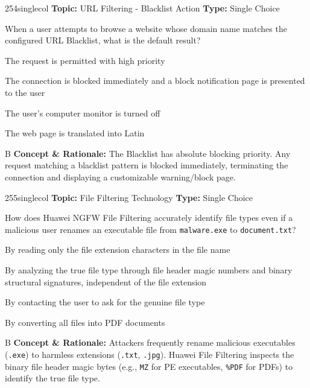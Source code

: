 \begin{qcard}{254}{singlecol}
\textcolor{darkslate!75}{\small\textbf{Topic:} URL Filtering - Blacklist Action \hfill \textbf{Type:} Single Choice}\vspace{0.4em}\par
When a user attempts to browse a website whose domain name matches the configured URL Blacklist, what is the default result?
\begin{qoptions}
\item The request is permitted with high priority
\item The connection is blocked immediately and a block notification page is presented to the user
\item The user's computer monitor is turned off
\item The web page is translated into Latin
\end{qoptions}
\end{qcard}
\nopagebreak
\begin{explainbox}{B}
\textbf{Concept \& Rationale:} The Blacklist has absolute blocking priority. Any request matching a blacklist pattern is blocked immediately, terminating the connection and displaying a customizable warning/block page.
\end{explainbox}

\begin{qcard}{255}{singlecol}
\textcolor{darkslate!75}{\small\textbf{Topic:} File Filtering Technology \hfill \textbf{Type:} Single Choice}\vspace{0.4em}\par
How does Huawei NGFW File Filtering accurately identify file types even if a malicious user renames an executable file from \texttt{malware.exe} to \texttt{document.txt}?
\begin{qoptions}
\item By reading only the file extension characters in the file name
\item By analyzing the true file type through file header magic numbers and binary structural signatures, independent of the file extension
\item By contacting the user to ask for the genuine file type
\item By converting all files into PDF documents
\end{qoptions}
\end{qcard}
\nopagebreak
\begin{explainbox}{B}
\textbf{Concept \& Rationale:} Attackers frequently rename malicious executables (\texttt{.exe}) to harmless extensions (\texttt{.txt}, \texttt{.jpg}). Huawei File Filtering inspects the binary file header magic bytes (e.g., \texttt{MZ} for PE executables, \texttt{\%PDF} for PDFs) to identify the true file type.
\end{explainbox}

